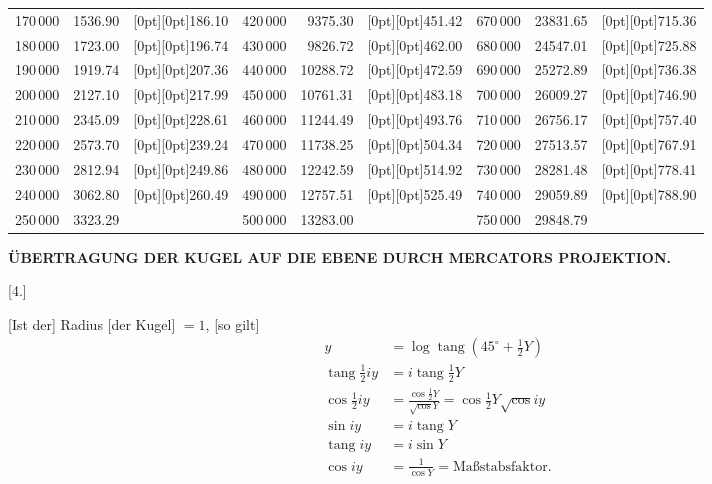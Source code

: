 {{\begin{tabular}{|r|r|r||r|r|r||r|r|r|}
170\,000 & 1536.90 & \raisebox{-6.7pt}[0pt][0pt]{186.10} & 420\,000 & 9375.30 & \raisebox{-6.7pt}[0pt][0pt]{451.42} & 670\,000 & 23831.65 & \raisebox{-6.7pt}[0pt][0pt]{715.36} \\
180\,000 & 1723.00 & \raisebox{-6.7pt}[0pt][0pt]{196.74} & 430\,000 & 9826.72 & \raisebox{-6.7pt}[0pt][0pt]{462.00} & 680\,000 & 24547.01 & \raisebox{-6.7pt}[0pt][0pt]{725.88} \\
190\,000 & 1919.74 & \raisebox{-6.7pt}[0pt][0pt]{207.36} & 440\,000 & 10288.72 & \raisebox{-6.7pt}[0pt][0pt]{472.59} & 690\,000 & 25272.89 & \raisebox{-6.7pt}[0pt][0pt]{736.38} \\
200\,000 & 2127.10 & \raisebox{-6.7pt}[0pt][0pt]{217.99} & 450\,000 & 10761.31 & \raisebox{-6.7pt}[0pt][0pt]{483.18} & 700\,000 & 26009.27 & \raisebox{-6.7pt}[0pt][0pt]{746.90} \\
\cline{1-2}\cline{4-5}\cline{7-8}
210\,000 & 2345.09\llap{\raisebox{-.85ex}[0pt][0pt]{.}} & \raisebox{-6.7pt}[0pt][0pt]{228.61} & 460\,000 & 11244.49 & \raisebox{-6.7pt}[0pt][0pt]{493.76} & 710\,000 & 26756.17 & \raisebox{-6.7pt}[0pt][0pt]{757.40} \\
220\,000 & 2573.70 & \raisebox{-6.7pt}[0pt][0pt]{239.24} & 470\,000 & 11738.25 & \raisebox{-6.7pt}[0pt][0pt]{504.34} & 720\,000 & 27513.57 & \raisebox{-6.7pt}[0pt][0pt]{767.91} \\
230\,000 & 2812.94 & \raisebox{-6.7pt}[0pt][0pt]{249.86} & 480\,000 & 12242.59 & \raisebox{-6.7pt}[0pt][0pt]{514.92} & 730\,000 & 28281.48 & \raisebox{-6.7pt}[0pt][0pt]{778.41} \\
240\,000 & 3062.80 & \raisebox{-6.7pt}[0pt][0pt]{260.49} & 490\,000 & 12757.51 & \raisebox{-6.7pt}[0pt][0pt]{525.49} & 740\,000 & 29059.89 & \raisebox{-6.7pt}[0pt][0pt]{788.90} \\
250\,000 & 3323.29 &  & 500\,000 & 13283.00 &  & 750\,000 & 29848.79 &  \\
\end{tabular}%
}\par}
\par\clearpage
\noindent\null\hfill{\fontsize{8}{10}\selectfont\textbf{ÜBERTRAGUNG DER KUGEL AUF DIE EBENE DURCH MERCATORS PROJEKTION.}}\hfill{}\par\medskip

\begin{center}[4.]\end{center}
[Ist der] Radius [der Kugel] \(=1\), [so gilt]
\[
\begin{aligned}
y&=\log\operatorname{tang}(45^\circ+\tfrac12Y)\\
\operatorname{tang}\tfrac12iy&=i\operatorname{tang}\tfrac12Y\\
\cos\tfrac12iy&=\frac{\cos\tfrac12Y}{\surd\cos Y}=\cos\tfrac12Y\surd\cos iy\\
\sin iy&=i\operatorname{tang}Y\\
\operatorname{tang}iy&=i\sin Y\\
\cos iy&=\frac1{\cos Y}=\text{Maßstabsfaktor.}
\end{aligned}
\]

